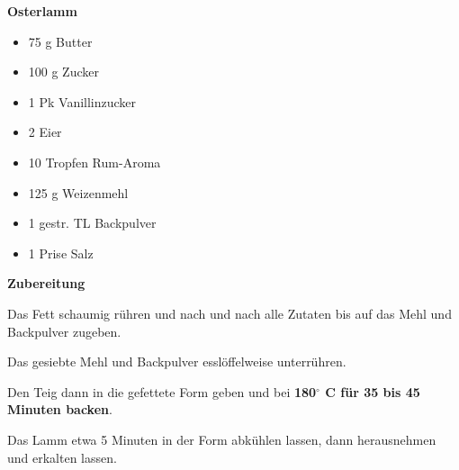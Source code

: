 

\parindent0pt	

\pagestyle{empty}


\textbf{{\LARGE Osterlamm}}%

\hrulefill
\vspace*{\fill}
\begin{multicols}{2}	


\begin{itemize}
\item 75 g Butter
\item 100 g Zucker
\item 1 Pk Vanillinzucker	
\item 2 Eier
\item 10 Tropfen Rum-Aroma
\item 125 g Weizenmehl
\item 1 gestr. TL Backpulver
\item 1 Prise Salz
\end{itemize}
\end{multicols}
\vfill									%

\vspace{2cm}
%
\begin{center}
%

\end{center}


\vfill
\newpage
\textbf{{\LARGE Zubereitung}}%

\hrulefill

\vspace*{\fill}
\begin{multicols}{2}

Das Fett schaumig rühren und nach und nach alle Zutaten bis auf das Mehl und Backpulver zugeben.

Das gesiebte Mehl und Backpulver esslöffelweise unterrühren.\newline

Den Teig dann in die gefettete Form geben und bei \textbf{ 180$^\circ$ C für 35 bis 45 Minuten backen}.\newline

Das Lamm etwa 5 Minuten in der Form abkühlen lassen, dann herausnehmen und erkalten lassen.


\end{multicols}
\vfill
